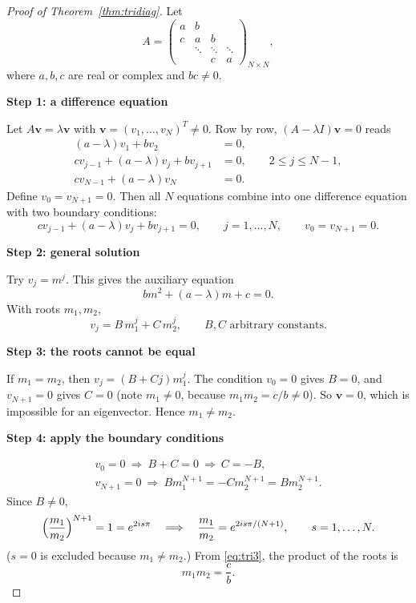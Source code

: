\documentclass[11pt,a4paper]{article}
\numberwithin{equation}{section}
\theoremstyle{spacedplain}
\theoremstyle{spaceddefinition}
\theoremstyle{spacedremark}
\newcommand{\step}[1]{\par\addvspace{0.6em}\noindent\textbf{#1}\par\nobreak}
\begin{document}
\begin{proof}[Proof of Theorem~\ref{thm:tridiag}]
Let
\[
  A=\begin{pmatrix}a&b&&\\ c&a&b&\\ &\ddots&\ddots&\ddots\\ &&c&a\end{pmatrix}_{N\times N},
\]
where \(a,b,c\) are real or complex and \(bc\ne0\).

\step{Step 1: a difference equation}
Let \(A\mathbf v=\lambda\mathbf v\)
with \(\mathbf v=(v_1,\dots,v_N)^T\ne0\).  Row by row,
\((A-\lambda I)\mathbf v=0\) reads
\begin{align*}
  (a-\lambda)v_1+bv_2&=0,\\
  cv_{j-1}+(a-\lambda)v_j+bv_{j+1}&=0,\qquad 2\le j\le N-1,\\
  cv_{N-1}+(a-\lambda)v_N&=0.
\end{align*}
Define \(v_0=v_{N+1}=0\).  Then all \(N\) equations combine into one
difference equation with two boundary conditions:
\begin{equation}\label{eq:tri1}
  cv_{j-1}+(a-\lambda)v_j+bv_{j+1}=0,\qquad j=1,\dots,N,
  \qquad v_0=v_{N+1}=0.
\end{equation}

\step{Step 2: general solution}
Try \(v_j=m^j\).  This gives the
auxiliary equation
\begin{equation}\label{eq:tri3}
  bm^2+(a-\lambda)m+c=0.
\end{equation}
With roots \(m_1,m_2\),
\[
  v_j=B\,m_1^j+C\,m_2^j,\qquad B,C\text{ arbitrary constants}.
\]

\step{Step 3: the roots cannot be equal}
If \(m_1=m_2\), then
\(v_j=(B+Cj)m_1^j\).  The condition \(v_0=0\) gives \(B=0\), and
\(v_{N+1}=0\) gives \(C=0\) (note \(m_1\ne0\), because
\(m_1m_2=c/b\ne0\)).  So \(\mathbf v=0\), which is impossible for an
eigenvector.  Hence \(m_1\ne m_2\).

\step{Step 4: apply the boundary conditions}

\[
\begin{gathered}
  v_0=0\ \Rightarrow\ B+C=0\ \Rightarrow\ C=-B,
  \\
  v_{N+1}=0\ \Rightarrow\ Bm_1^{N+1}=-Cm_2^{N+1}=Bm_2^{N+1}.
\end{gathered}
\]
Since \(B\ne0\),
\begin{equation}\label{eq:tri4}
  \Bigl(\frac{m_1}{m_2}\Bigr)^{N+1}=1=e^{2is\pi}
  \quad\Longrightarrow\quad
  \frac{m_1}{m_2}=e^{2is\pi/(N+1)},\qquad s=1,\dots,N.
\end{equation}
(\(s=0\) is excluded because \(m_1\ne m_2\).)  From \eqref{eq:tri3},
the product of the roots is
\begin{equation}\label{eq:tri5}
  m_1m_2=\frac cb.
\end{equation}


\end{proof}
\end{document}
